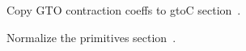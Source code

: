 \Wmods
\:Copy GTO contraction coeffs to gtoC\X \X
\WU section~.

\:Normalize the primitives\X \X
\WU section~.


